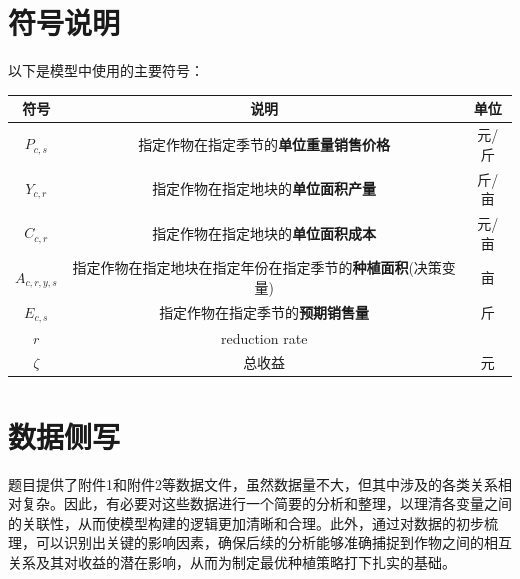 \documentclass{cumcmthesis}
\begin{document}
\section{符号说明}
以下是模型中使用的主要符号：
\begin{table}[!htbp]
    \begin{tabular}{ccc}
        \toprule[1.5pt]
        符号 & 说明 & 单位\\
        \midrule[1pt]
        $P_{c,s}$ & 指定作物在指定季节的\textbf{单位重量销售价格} & 元/斤 \\
        $Y_{c,r}$ & 指定作物在指定地块的\textbf{单位面积产量} & 斤/亩\\
        $C_{c,r}$ & 指定作物在指定地块的\textbf{单位面积成本} & 元/亩\\
        $A_{c,r,y,s}$ & 指定作物在指定地块在指定年份在指定季节的\textbf{种植面积}(决策变量) & 亩\\
        $E_{c,s}$ & 指定作物在指定季节的\textbf{预期销售量} & 斤\\
        $r$ & reduction rate & \\
        
        $\zeta$ & 总收益 & 元\\
        \bottomrule[1.5pt]
    \end{tabular}
\end{table}

\section{数据侧写}
题目提供了附件1和附件2等数据文件，虽然数据量不大，但其中涉及的各类关系相对复杂。因此，有必要对这些数据进行一个简要的分析和整理，以理清各变量之间的关联性，从而使模型构建的逻辑更加清晰和合理。此外，通过对数据的初步梳理，可以识别出关键的影响因素，确保后续的分析能够准确捕捉到作物之间的相互关系及其对收益的潜在影响，从而为制定最优种植策略打下扎实的基础。
\end{document}
